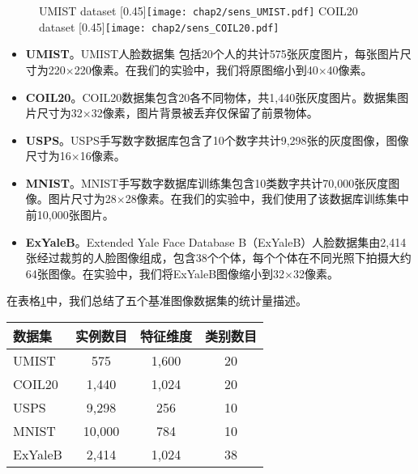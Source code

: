 \begin{figure}[t]
	\centering
					{UMIST dataset}
					[0.45\textwidth]{\texttt{[image: chap2/sens\_UMIST.pdf]}}
	\hspace{1em}
					{COIL20 dataset}
					[0.45\textwidth]{\texttt{[image: chap2/sens\_COIL20.pdf]}}
	\label{fig2:Sen}
\end{figure} 

\begin{itemize}
	\item {\textbf{UMIST}}。UMIST人脸数据集 \cite{graham1998characterising}包括20个人的共计575张灰度图片，每张图片尺寸为220$ \times $220像素。在我们的实验中，我们将原图缩小到40$ \times $40像素。
	\item {\textbf{COIL20}}。COIL20数据集\cite{nene1996columbia}包含20各不同物体，共1,440张灰度图片。数据集图片尺寸为32$\times$32像素，图片背景被丢弃仅保留了前景物体。
	\item {\textbf{USPS}}。USPS手写数字数据库\cite{hull1994database}包含了10个数字共计9,298张的灰度图像，图像尺寸为16$\times$16像素。
	\item {\textbf{MNIST}}。MNIST手写数字数据库\cite{lecun1998gradient}训练集包含10类数字共计70,000张灰度图像。图片尺寸为28$\times$28像素。在我们的实验中，我们使用了该数据库训练集中前10,000张图片。
	\item {\textbf{ExYaleB}}。Extended Yale Face Database B（ExYaleB）人脸数据集\cite{KCLee05}由2,414张经过裁剪的人脸图像组成，包含38个个体，每个个体在不同光照下拍摄大约64张图像。在实验中，我们将ExYaleB图像缩小到32$ \times $32像素。
\end{itemize}

在表格\ref{tab2:Data}中，我们总结了五个基准图像数据集的统计量描述。

\begin{table}[t]
	\label{tab2:Data}
	\centering
	\begin{tabular}{l c c c}
		\toprule
		数据集 & 实例数目 & 特征维度 & 类别数目\\ 
		\midrule
		UMIST & 575 & 1,600 & 20\\
		COIL20 & 1,440 & 1,024 & 20\\
		USPS & 9,298 & 256 & 10\\
		MNIST & 10,000 & 784 & 10\\
		ExYaleB & 2,414 & 1,024 & 38\\
		\bottomrule
	\end{tabular}
\end{table}

